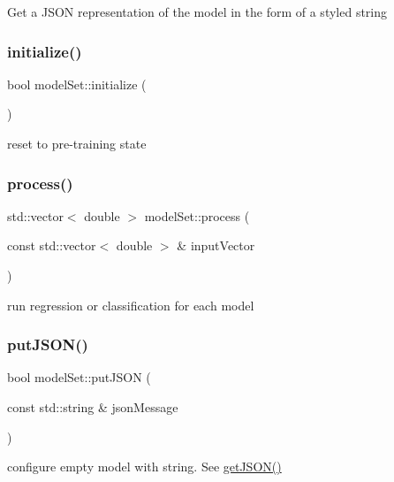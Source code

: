 Get a J\+S\+ON representation of the model in the form of a styled string \mbox{\label{classmodel_set_afefb50a0fe8f45821c6a7599784d7eb4}} 
\subsubsection{\texorpdfstring{initialize()}{initialize()}}
{\footnotesize\ttfamily bool model\+Set\+::initialize (\begin{DoxyParamCaption}{ }\end{DoxyParamCaption})}

reset to pre-\/training state \mbox{\label{classmodel_set_a3b95db9f976d19764665e0761cae4a3c}} 
\subsubsection{\texorpdfstring{process()}{process()}}
{\footnotesize\ttfamily std\+::vector$<$ double $>$ model\+Set\+::process (\begin{DoxyParamCaption}\item[{const std\+::vector$<$ double $>$ \&}]{input\+Vector }\end{DoxyParamCaption})}

run regression or classification for each model \mbox{\label{classmodel_set_a37dfe2eb4164986ccba8617da63a1dbc}} 
\subsubsection{\texorpdfstring{put\+J\+S\+O\+N()}{putJSON()}}
{\footnotesize\ttfamily bool model\+Set\+::put\+J\+S\+ON (\begin{DoxyParamCaption}\item[{const std\+::string \&}]{json\+Message }\end{DoxyParamCaption})}

configure empty model with string. See \hyperlink{classmodel_set_a031987885b1462ec7d7dbeef0c803d97}{get\+J\+S\+O\+N()} \mbox{\label{classmodel_set_afd7886381e98dabea0771d9e7badc4da}} 
